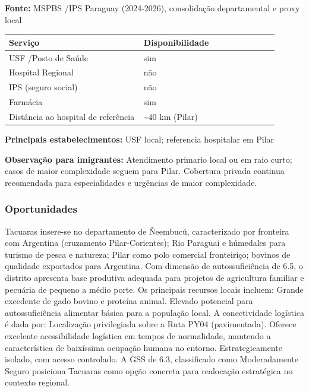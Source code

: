 \textbf{Fonte:} MSPBS /\allowbreak  IPS Paraguay (2024-2026), consolidação
departamental e proxy local

{\def\LTcaptype{none} %
\begin{longtable}{@{}>{\raggedright\arraybackslash}p{0.45\linewidth} >{\raggedright\arraybackslash}p{0.45\linewidth}@{}}
\toprule\noalign{}
Serviço & Disponibilidade \\
\midrule\noalign{}
\endhead
\bottomrule\noalign{}
\endlastfoot
USF /\allowbreak  Posto de Saúde & sim \\
Hospital Regional & não \\
IPS (seguro social) & não \\
Farmácia & sim \\
Distância ao hospital de referência & \textasciitilde40 km (Pilar) \\
\end{longtable}
}

\textbf{Principais estabelecimentos:} USF local; referencia hospitalar
em Pilar

\textbf{Observação para imigrantes:} Atendimento primario local ou em
raio curto; casos de maior complexidade seguem para Pilar. Cobertura
privada continua recomendada para especialidades e urgências de maior
complexidade.
\newpage

\subsubsection*{Oportunidades}\label{oport-tacuaras-1213}
Tacuaras insere-se no departamento de Ñeembucú, caracterizado por fronteira com Argentina (cruzamento Pilar-Corientes); Rio Paraguai e húmedales para turismo de pesca e natureza; Pilar como polo comercial fronteiriço; bovinos de qualidade exportados para Argentina. Com dimensão de autossuficiência de 6.5, o distrito apresenta base produtiva adequada para projetos de agricultura familiar e pecuária de pequeno a médio porte. Os principais recursos locais incluem: Grande excedente de gado bovino e proteína animal. Elevado potencial para autossuficiência alimentar básica para a população local. A conectividade logística é dada por: Localização privilegiada sobre a Ruta PY04 (pavimentada). Oferece excelente acessibilidade logística em tempos de normalidade, mantendo a característica de baixíssima ocupação humana no entorno. Estrategicamente isolado, com acesso controlado. A GSS de 6.3, classificado como Moderadamente Seguro posiciona Tacuaras como opção concreta para realocação estratégica no contexto regional.

